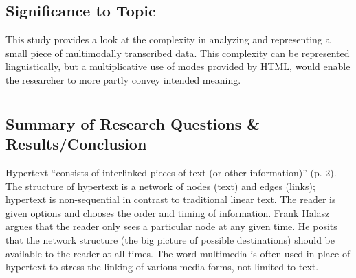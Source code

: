\documentclass[leavefloats]{apa6e}\usepackage[]{graphicx}\usepackage[]{color}
\begin{document}
\subsection{Significance to Topic} %
This study provides a look at the complexity in analyzing and representing a small piece of multimodally transcribed data.  This complexity can be represented linguistically, but a multiplicative use of modes provided by HTML, would enable the researcher to more partly convey intended meaning.


 \section{\textcite{Nielsen1995a}}





\regpar



\subsection{Summary of Research Questions \& Results/Conclusion} %
Hypertext ``consists of interlinked pieces of text (or other information)'' (p. 2).  The structure of hypertext is a network of nodes (text) and edges (links); hypertext is non-sequential in contrast to traditional linear text.  The reader is given options and chooses the order and timing of information.   Frank Halasz argues that the reader only sees a particular node at any given time.  He posits that the network structure (the big picture of possible destinations) should be available to the reader at all times.  The word multimedia is often used in place of hypertext to stress the linking of various media forms, not limited to text.  
\end{document}
